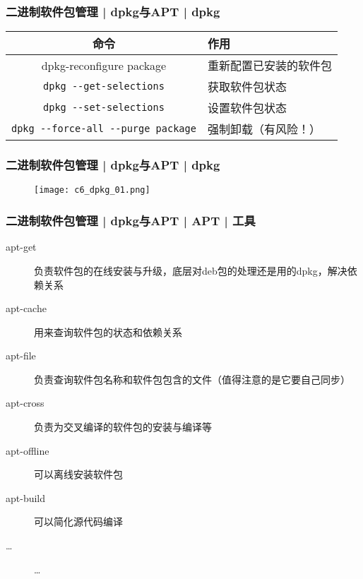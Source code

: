 \begin{frame}[fragile]
  \frametitle{二进制软件包管理 | dpkg与APT | dpkg}
  \begin{table}
    \centering
    \begin{tabularx}{\textwidth}{cX}
      \hline
      \rowcolor{blue!50}命令 & 作用\\
      \hline
      dpkg-reconfigure package & 重新配置已安装的软件包\\
      \verb|dpkg --get-selections| & 获取软件包状态\\
      \verb|dpkg --set-selections| & 设置软件包状态\\
      \verb|dpkg --force-all --purge package| & 强制卸载（有风险！）\\
      \hline
    \end{tabularx}
  \end{table}
\end{frame}

\begin{frame}
  \frametitle{二进制软件包管理 | dpkg与APT | dpkg}
  \begin{figure}
    \centering
    \texttt{[image: c6\_dpkg\_01.png]}
  \end{figure}
\end{frame}

\begin{frame}
  \frametitle{二进制软件包管理 | dpkg与APT | APT | 工具}
  \begin{description}
    \item[apt-get] 负责软件包的在线安装与升级，底层对deb包的处理还是用的dpkg，解决依赖关系
    \item[apt-cache] 用来查询软件包的状态和依赖关系
    \item[apt-file] 负责查询软件包名称和软件包包含的文件（值得注意的是它要自己同步）
    \item[apt-cross] 负责为交叉编译的软件包的安装与编译等
    \item[apt-offline] 可以离线安装软件包
    \item[apt-build] 可以简化源代码编译
    \item[\ldots] \ldots
  \end{description}
\end{frame}

